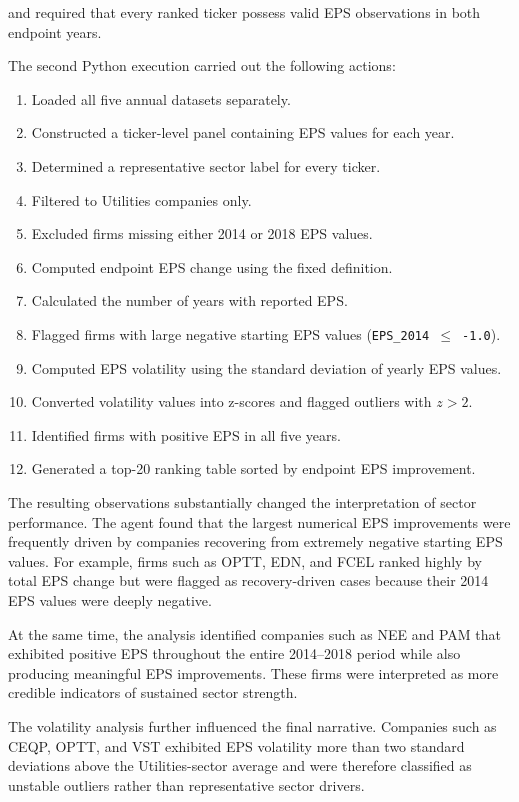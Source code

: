 and required that every ranked ticker possess valid EPS observations in both endpoint years.

The second Python execution carried out the following actions:

\begin{enumerate}
  \item Loaded all five annual datasets separately.
  \item Constructed a ticker-level panel containing EPS values for each year.
  \item Determined a representative sector label for every ticker.
  \item Filtered to Utilities companies only.
  \item Excluded firms missing either 2014 or 2018 EPS values.
  \item Computed endpoint EPS change using the fixed definition.
  \item Calculated the number of years with reported EPS.
  \item Flagged firms with large negative starting EPS values (\texttt{EPS\_2014 $\leq$ -1.0}).
  \item Computed EPS volatility using the standard deviation of yearly EPS values.
  \item Converted volatility values into z-scores and flagged outliers with $z > 2$.
  \item Identified firms with positive EPS in all five years.
  \item Generated a top-20 ranking table sorted by endpoint EPS improvement.
\end{enumerate}

The resulting observations substantially changed the interpretation of sector performance. The agent found that the largest numerical EPS improvements were frequently driven by companies recovering from extremely negative starting EPS values. For example, firms such as OPTT, EDN, and FCEL ranked highly by total EPS change but were flagged as recovery-driven cases because their 2014 EPS values were deeply negative.

At the same time, the analysis identified companies such as NEE and PAM that exhibited positive EPS throughout the entire 2014--2018 period while also producing meaningful EPS improvements. These firms were interpreted as more credible indicators of sustained sector strength.

The volatility analysis further influenced the final narrative. Companies such as CEQP, OPTT, and VST exhibited EPS volatility more than two standard deviations above the Utilities-sector average and were therefore classified as unstable outliers rather than representative sector drivers.

